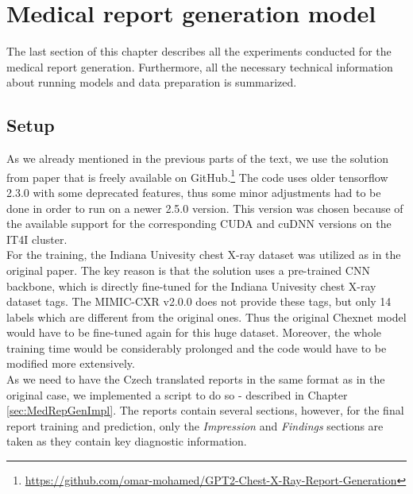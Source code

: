 \section{Medical report generation model}
The last section of this chapter describes all the experiments conducted for the medical report generation. Furthermore, all the necessary technical information about running models and data preparation is summarized.

\subsection{Setup}
As we already mentioned in the previous parts of the text, we use the solution from \citet{alfarghaly2021automated} paper that is freely available on GitHub.\footnote[4]{\url{https://github.com/omar-mohamed/GPT2-Chest-X-Ray-Report-Generation}} The code uses older tensorflow 2.3.0 with some deprecated features, thus some minor adjustments had to be done in order to run on a newer 2.5.0 version. This version was chosen because of the available support for the corresponding CUDA and cuDNN versions on the IT4I cluster. \\

For the training, the Indiana Univesity chest X-ray dataset was utilized as in the original paper. The key reason is that the solution uses a pre-trained CNN backbone, which is directly fine-tuned for the Indiana Univesity chest X-ray dataset tags. The MIMIC-CXR v2.0.0 does not provide these tags, but only 14 labels which are different from the original ones. Thus the original Chexnet model would have to be fine-tuned again for this huge dataset. Moreover, the whole training time would be considerably prolonged and the code would have to be modified more extensively.\\
 
As we need to have the Czech translated reports in the same format as in the original case, we implemented a script to do so - described in Chapter \ref{sec:MedRepGenImpl}. The reports contain several sections, however, for the final report training and prediction, only the \textit{Impression} and \textit{Findings} sections are taken as they contain key diagnostic information. 

